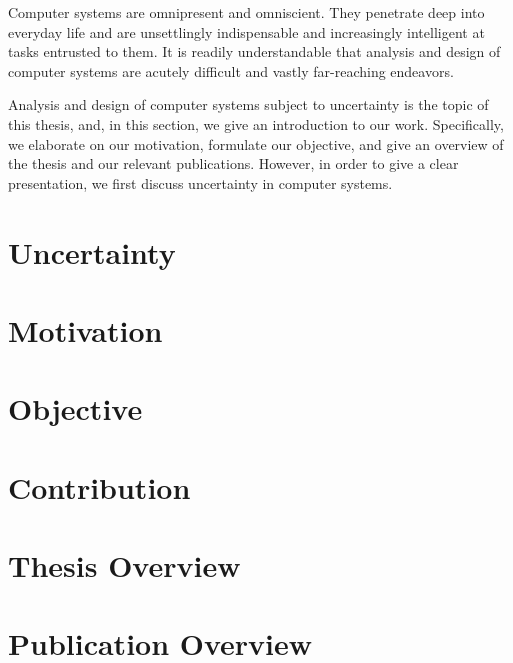 Computer systems are omnipresent and omniscient. They penetrate deep into
everyday life and are unsettlingly indispensable and increasingly intelligent at
tasks entrusted to them. It is readily understandable that analysis and design
of computer systems are acutely difficult and vastly far-reaching endeavors.

Analysis and design of computer systems subject to uncertainty is the topic of
this thesis, and, in this section, we give an introduction to our work.
Specifically, we elaborate on our motivation, formulate our objective, and give
an overview of the thesis and our relevant publications. However, in order to
give a clear presentation, we first discuss uncertainty in computer systems.

\section{Uncertainty}

\section{Motivation}

\section{Objective}

\section{Contribution}

\section{Thesis Overview}

\section{Publication Overview}
